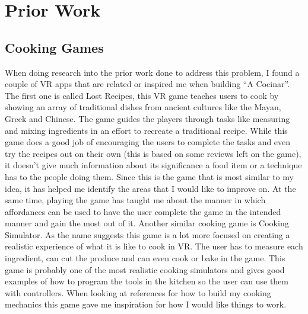 \documentclass[10pt,twocolumn]{article}
\begin{document}
\section{Prior Work}
\subsection{Cooking Games}
When doing research into the prior work done to address this problem, I found a couple of VR apps that are related or inspired me when building “A Cocinar”. The first one is called Lost Recipes, this VR game teaches users to cook by showing an array of traditional dishes from ancient cultures like the Mayan, Greek and Chinese. The game guides the players through tasks like measuring and mixing ingredients in an effort to recreate a traditional recipe. While this game does a good job of encouraging the users to complete the tasks and even try the recipes out on their own (this is based on some reviews left on the game), it doesn’t give much information about its significance a food item or a technique has to the people doing them. Since this is the game that is most similar to my idea, it has helped me identify the areas that I would like to improve on. At the same time, playing the game has taught me about the manner in which affordances can be used to have the user complete the game in the intended manner and gain the most out of it. Another similar cooking game is Cooking Simulator. As the name suggests this game is a lot more focused on creating a realistic experience of what it is like to cook in VR. The user has to measure each ingredient, can cut the produce and can even cook or bake in the game. This game is probably one of the most realistic cooking simulators and gives good examples of how to program the tools in the kitchen so the user can use them with controllers. When looking at references for how to build my cooking mechanics this game gave me inspiration for how I would like things to work. 
\end{document}
